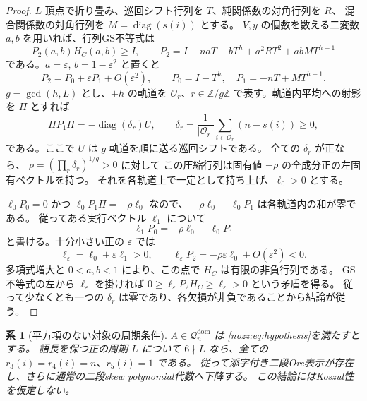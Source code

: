 \documentclass[11pt,a4paper]{ltjsarticle}
\newtheorem{corollary}[theorem]{系}
\theoremstyle{definition}
\begin{document}
\begin{proof}
$L$ 頂点で折り畳み、巡回シフト行列を $T$、純関係数の対角行列を $R$、
混合関係数の対角行列を $M=\operatorname{diag}(s(i))$ とする。
$V,y$ の個数を数える二変数 $a,b$ を用いれば、行列GS不等式は
\[
 P_2(a,b)H_C(a,b)\ge I,
 \qquad
 P_2=I-naT-bT^h+a^2RT^2+abMT^{h+1}
\]
である。$a=\varepsilon$, $b=1-\varepsilon^2$ と置くと
\[
 P_2=P_0+\varepsilon P_1+O(\varepsilon^2),
 \qquad P_0=I-T^h,\quad P_1=-nT+MT^{h+1}.
\]
$g=\gcd(h,L)$ とし、$+h$ の軌道を $\mathcal O_r$、$r\in\mathbb Z/g\mathbb Z$
で表す。軌道内平均への射影を $\Pi$ とすれば
\[
 \Pi P_1\Pi=-\operatorname{diag}(\delta_r)U,
 \qquad
 \delta_r=\frac1{|\mathcal O_r|}\sum_{i\in\mathcal O_r}(n-s(i))\ge0,
\]
である。ここで $U$ は $g$ 軌道を順に送る巡回シフトである。
全ての $\delta_r$ が正なら、
$\rho=(\prod_r\delta_r)^{1/g}>0$ に対して
この圧縮行列は固有値 $-\rho$ の全成分正の左固有ベクトルを持つ。
それを各軌道上で一定として持ち上げ、$\ell_0>0$ とする。

$\ell_0P_0=0$ かつ $\ell_0P_1\Pi=-\rho\ell_0$ なので、
$-\rho\ell_0-\ell_0P_1$ は各軌道内の和が零である。
従ってある実行ベクトル $\ell_1$ について
\[
 \ell_1P_0=-\rho\ell_0-\ell_0P_1
\]
と書ける。十分小さい正の $\varepsilon$ では
\[
 \ell_\varepsilon=\ell_0+\varepsilon\ell_1>0,
 \qquad
 \ell_\varepsilon P_2=-\rho\varepsilon\ell_0+O(\varepsilon^2)<0.
\]
多項式増大と $0<a,b<1$ により、この点で $H_C$ は有限の非負行列である。
GS不等式の左から $\ell_\varepsilon$ を掛ければ
$0\ge\ell_\varepsilon P_2H_C\ge\ell_\varepsilon>0$ という矛盾を得る。
従って少なくとも一つの $\delta_r$ は零であり、各欠損が非負であることから結論が従う。
\end{proof}

\begin{corollary}[平方項のない対象の周期条件]
\label{nozz:cor:periodic-saturation}
$A\in\mathcal Q_n^{\mathrm{dom}}$ は
\eqref{nozz:eq:hypothesis}を満たすとする。
語長を保つ正の周期 $L$ について $6\nmid L$ なら、全ての $r_3(i)=r_4(i)=n$、$r_5(i)=1$ である。
従って添字付き二段Ore表示が存在し、さらに通常の二段skew polynomial代数へ下降する。
この結論にはKoszul性を仮定しない。
\end{corollary}
\end{document}
